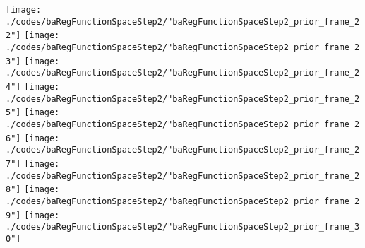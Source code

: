 \begin{frame}{\insertsection}
\begin{center}
{\begin{animateinline}{20}
				 \texttt{[image: ./codes/baRegFunctionSpaceStep2/"baRegFunctionSpaceStep2\_prior\_frame\_22"]}\newframe
				 \texttt{[image: ./codes/baRegFunctionSpaceStep2/"baRegFunctionSpaceStep2\_prior\_frame\_23"]}\newframe
				 \texttt{[image: ./codes/baRegFunctionSpaceStep2/"baRegFunctionSpaceStep2\_prior\_frame\_24"]}\newframe
				 \texttt{[image: ./codes/baRegFunctionSpaceStep2/"baRegFunctionSpaceStep2\_prior\_frame\_25"]}\newframe
				 \texttt{[image: ./codes/baRegFunctionSpaceStep2/"baRegFunctionSpaceStep2\_prior\_frame\_26"]}\newframe
				 \texttt{[image: ./codes/baRegFunctionSpaceStep2/"baRegFunctionSpaceStep2\_prior\_frame\_27"]}\newframe
				 \texttt{[image: ./codes/baRegFunctionSpaceStep2/"baRegFunctionSpaceStep2\_prior\_frame\_28"]}\newframe
				 \texttt{[image: ./codes/baRegFunctionSpaceStep2/"baRegFunctionSpaceStep2\_prior\_frame\_29"]}\newframe
				 \texttt{[image: ./codes/baRegFunctionSpaceStep2/"baRegFunctionSpaceStep2\_prior\_frame\_30"]}
			 \end{animateinline}
			}
	\end{center}
    
\end{frame}


